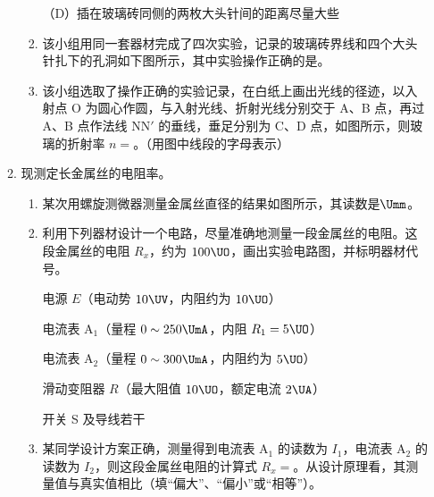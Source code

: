 \documentclass[\gkver]{gaokaozhenti}
\begin{document}
\begin{enumerate}
\begin{enumerate}
\begin{enumerate}
		（D）插在玻璃砖同侧的两枚大头针间的距离尽量大些
		\item
		该小组用同一套器材完成了四次实验，记录的玻璃砖界线和四个大头针扎下的孔洞如下图所示，其中实验操作正确的是。

		\fourchoices[answer=D, ispicture=true, hA=3.12cm, hB=3.15cm, hC=3.15cm, hD=3.15cm]
		{}
		{}
		{}
		{}
		\item
		该小组选取了操作正确的实验记录，在白纸上画出光线的径迹，以入射点 O 为圆心作圆，与入射光线、折射光线分别交于 A、B 点，再过 A、B 点作法线 NN$'$ 的垂线，垂足分别为 C、D 点，如图所示，则玻璃的折射率 $n=$。（用图中线段的字母表示）

	\end{enumerate}
	\item
	现测定长金属丝的电阻率。

	\begin{enumerate}
		\item
		某次用螺旋测微器测量金属丝直径的结果如图所示，其读数是$\Umm$。

		\item
		利用下列器材设计一个电路，尽量准确地测量一段金属丝的电阻。这段金属丝的电阻 $R_{x}$，约为 $100\UO$，画出实验电路图，并标明器材代号。

		电源 $E$\quad（电动势 $10\UV$，内阻约为 $10\UO$）

		电流表 A$_{1}$\quad（量程 $0 \sim 250\UmA$，内阻 $R_{1} = 5\UO$）

		电流表 A$_{2}$\quad（量程 $0 \sim 300\UmA$，内阻约为 $5\UO$）

		滑动变阻器 $R$\quad（最大阻值 $10\UO$，额定电流 $2\UA$）

		开关 S 及导线若干
		\item
		某同学设计方案正确，测量得到电流表 A$_{1}$ 的读数为 $I_{1}$，电流表 A$_{2}$ 的读数为 $I_{2}$，则这段金属丝电阻的计算式 $R_{x}=$。从设计原理看，其测量值与真实值相比（填“偏大”、“偏小”或“相等”）。
	\end{enumerate}
\end{enumerate}
\end{enumerate}
\end{document}
